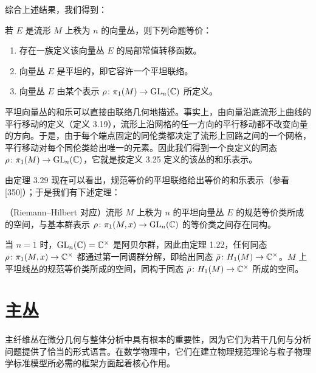 综合上述结果，我们得到：

\begin{theorem}[3.29]
若 $E$ 是流形 $M$ 上秩为 $n$ 的向量丛，则下列命题等价：
\begin{enumerate}[label=\arabic*.]
\item 存在一族定义该向量丛 $E$ 的局部常值转移函数。
\item 向量丛 $E$ 是平坦的，即它容许一个平坦联络。
\item 向量丛 $E$ 由某个表示 $\rho\colon\pi_1(M)\to\operatorname{GL}_n(\mathbb{C})$ 所定义。
\end{enumerate}
\end{theorem}

平坦向量丛的和乐可以直接由联络几何地描述。事实上，由向量沿底流形上曲线的平行移动的定义（定义 3.19），流形上沿网格的任一方向的平行移动都不改变向量的方向。于是，由于每个端点固定的同伦类都决定了流形上回路之间的一个网格，平行移动对每个同伦类给出唯一的元素。因此我们得到一个良定义的同态 $\rho\colon\pi_1(M)\to\operatorname{GL}_n(\mathbb{C})$，它就是按定义 3.25 定义的该丛的和乐表示。

由定理 3.29 现在可以看出，规范等价的平坦联络给出等价的和乐表示（参看 [350]）；于是我们有下述定理：

\begin{theorem}[3.30]
（Riemann–Hilbert 对应）流形 $M$ 上秩为 $n$ 的平坦向量丛 $E$ 的规范等价类所成的空间，与基本群表示 $\rho\colon\pi_1(M,x)\to\operatorname{GL}_n(\mathbb{C})$ 的等价类之间存在同构。
\end{theorem}

\begin{remark}[3.31]
当 $n=1$ 时，$\operatorname{GL}_n(\mathbb{C})=\mathbb{C}^\times$ 是阿贝尔群，因此由定理 1.22，任何同态 $\rho\colon\pi_1(M,x)\to\mathbb{C}^\times$ 都通过第一同调群分解，即给出同态 $\bar\rho\colon H_1(M)\to\mathbb{C}^\times$。$M$ 上平坦线丛的规范等价类所成的空间，同构于同态 $\bar\rho\colon H_1(M)\to\mathbb{C}^\times$ 所成的空间。
\end{remark}

\section{主丛}

主纤维丛在微分几何与整体分析中具有根本的重要性，因为它们为若干几何与分析问题提供了恰当的形式语言。在数学物理中，它们在建立物理规范理论与粒子物理学标准模型所必需的框架方面起着核心作用。

